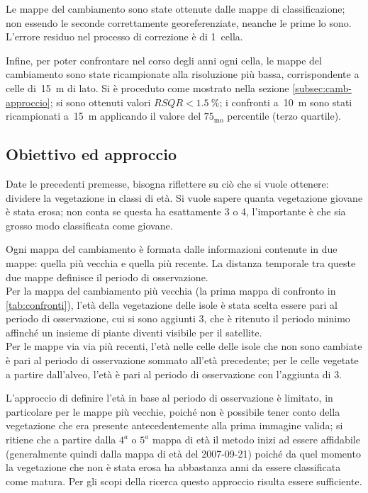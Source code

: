 Le mappe del cambiamento sono state ottenute dalle mappe di classificazione; non essendo le seconde correttamente georeferenziate, neanche le prime lo sono. L'errore residuo nel processo di correzione è di 1~cella.

Infine, per poter confrontare nel corso degli anni ogni cella, le mappe del cambiamento sono state ricampionate alla risoluzione più bassa, corrispondente a celle di~\SI{15}{\m} di lato. Si è proceduto come mostrato nella sezione \ref{subsec:camb-approccio}; si sono ottenuti valori $RSQR < \SI{1.5}{\percent}$; i confronti a~\SI{10}{\m} sono stati ricampionati a~\SI{15}{\m} applicando il valore del $75_\mathrm{mo}$ percentile (terzo quartile).


\subsection{Obiettivo ed approccio} 
Date le precedenti premesse, bisogna riflettere su ciò che si vuole ottenere: dividere la vegetazione in classi di età.
Si vuole sapere quanta vegetazione giovane è stata erosa; non conta se questa ha esattamente \SI{3}{\anni} o \SI{4}{\anni}, l'importante è che sia grosso modo classificata come giovane.

Ogni mappa del cambiamento è formata dalle informazioni contenute in due mappe: quella più vecchia e quella più recente. La distanza temporale tra queste due mappe definisce il periodo di osservazione.
\\
Per la mappa del cambiamento più vecchia (la prima mappa di confronto in \cref{tab:confronti}), l'età della vegetazione delle isole è stata scelta essere pari al periodo di osservazione, cui si sono aggiunti \SI{3}{\anni}, che è ritenuto il periodo minimo affinché un insieme di piante diventi visibile per il satellite.
\\
Per le mappe via via più recenti, l'età nelle celle delle isole che non sono cambiate è pari al periodo di osservazione sommato all'età precedente; per le celle vegetate a partire dall'alveo, l'età è pari al periodo di osservazione con l'aggiunta di \SI{3}{\anni}.

L'approccio di definire l'età in base al periodo di osservazione è limitato, in particolare per le mappe più vecchie, poiché non è possibile tener conto della vegetazione che era presente antecedentemente alla prima immagine valida;
si ritiene che a partire dalla $4^a$ o $5^a$ mappa di età il metodo inizi ad essere affidabile (generalmente quindi dalla mappa di età del 2007-09-21) poiché da quel momento la vegetazione che non è stata erosa ha abbastanza anni da essere classificata come matura.
Per gli scopi della ricerca questo approccio risulta essere sufficiente.

